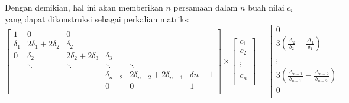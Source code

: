 Dengan demikian, hal ini akan memberikan $n$ persamaan dalam $n$ buah nilai $c_i$ yang dapat dikonstruksi sebagai perkalian matriks:
\begin{equation} \label{eq:2.10}
	\begin{bmatrix}
		1        & 0                     & 0                     &              &                               &             \\
		\delta_1 & 2\delta_1 + 2\delta_2 & \delta_2              &              &                               &             \\
		0        & \delta_2              & 2\delta_2 + 2\delta_3 & \delta_3     &                               &             \\
		         & \ddots                & \ddots                & \ddots       & \ddots                        &             \\
		         &                       &                       & \delta_{n-2} & 2\delta_{n-2} + 2\delta_{n-1} & \delta{n-1} \\
		         &                       &                       & 0            & 0                             & 1           \\
	\end{bmatrix}
	\times
	\begin{bmatrix}
		c_1    \\
		c_2    \\
		\\
		\vdots \\
		\\
		c_n    \\
	\end{bmatrix}
	=
	\begin{bmatrix}
		0                                                                        \\
		3(\frac{\Delta_2}{\delta_2} - \frac{\Delta_1}{\delta_1})                 \\
		\\
		\vdots                                                                   \\
		3(\frac{\Delta_{n-1}}{\delta_{n-1}} - \frac{\Delta_{n-2}}{\delta_{n-2}}) \\
		0                                                                        \\
	\end{bmatrix}
\end{equation}

